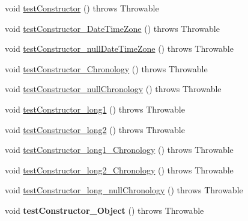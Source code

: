 \begin{DoxyCompactItemize}
\item 
void \hyperlink{classorg_1_1joda_1_1time_1_1_test_year_month_day___constructors_ad017874c6f765b073f66d8d649cbf9d0}{test\-Constructor} ()  throws Throwable 
\item 
void \hyperlink{classorg_1_1joda_1_1time_1_1_test_year_month_day___constructors_a119f65e1c112e4d7a70e3f2e60ddb7f8}{test\-Constructor\-\_\-\-Date\-Time\-Zone} ()  throws Throwable 
\item 
void \hyperlink{classorg_1_1joda_1_1time_1_1_test_year_month_day___constructors_ab271a9baea9b1fcf9c2abf80348b7bba}{test\-Constructor\-\_\-null\-Date\-Time\-Zone} ()  throws Throwable 
\item 
void \hyperlink{classorg_1_1joda_1_1time_1_1_test_year_month_day___constructors_aeaa21a0ab897a9b442485d6e6b81074f}{test\-Constructor\-\_\-\-Chronology} ()  throws Throwable 
\item 
void \hyperlink{classorg_1_1joda_1_1time_1_1_test_year_month_day___constructors_ab1407527d6d900c252868fa49dc57225}{test\-Constructor\-\_\-null\-Chronology} ()  throws Throwable 
\item 
void \hyperlink{classorg_1_1joda_1_1time_1_1_test_year_month_day___constructors_aaed96873d987d23b7a63c5972f8664c2}{test\-Constructor\-\_\-long1} ()  throws Throwable 
\item 
void \hyperlink{classorg_1_1joda_1_1time_1_1_test_year_month_day___constructors_acbbc7e8693876335bb6163459c5736ad}{test\-Constructor\-\_\-long2} ()  throws Throwable 
\item 
void \hyperlink{classorg_1_1joda_1_1time_1_1_test_year_month_day___constructors_a443b0cc006b57c38552aaa3a4df152e1}{test\-Constructor\-\_\-long1\-\_\-\-Chronology} ()  throws Throwable 
\item 
void \hyperlink{classorg_1_1joda_1_1time_1_1_test_year_month_day___constructors_a79c2f32560e9dd07ed88a3362187b3a1}{test\-Constructor\-\_\-long2\-\_\-\-Chronology} ()  throws Throwable 
\item 
void \hyperlink{classorg_1_1joda_1_1time_1_1_test_year_month_day___constructors_a261b3dd5689301c6c7813b891dc341a5}{test\-Constructor\-\_\-long\-\_\-null\-Chronology} ()  throws Throwable 
\item 
\hypertarget{classorg_1_1joda_1_1time_1_1_test_year_month_day___constructors_a3931f72f9417f1b0671c8880bfee8e7a}{void {\bfseries test\-Constructor\-\_\-\-Object} ()  throws Throwable }\label{classorg_1_1joda_1_1time_1_1_test_year_month_day___constructors_a3931f72f9417f1b0671c8880bfee8e7a}


\end{DoxyCompactItemize}
